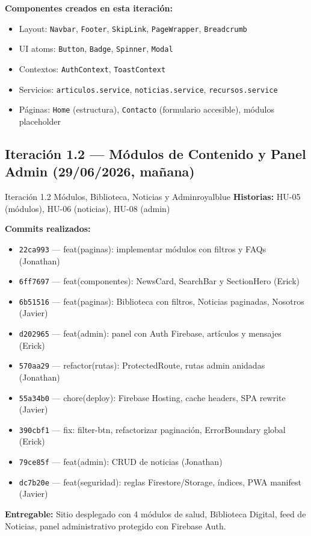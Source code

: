 \documentclass[12pt, a4paper]{article}
\begin{document}
\vspace{4pt}

\textbf{Componentes creados en esta iteración:}
\begin{itemize}
  \item Layout: \texttt{Navbar}, \texttt{Footer}, \texttt{SkipLink}, \texttt{PageWrapper}, \texttt{Breadcrumb}
  \item UI atoms: \texttt{Button}, \texttt{Badge}, \texttt{Spinner}, \texttt{Modal}
  \item Contextos: \texttt{AuthContext}, \texttt{ToastContext}
  \item Servicios: \texttt{articulos.service}, \texttt{noticias.service}, \texttt{recursos.service}
  \item Páginas: \texttt{Home} (estructura), \texttt{Contacto} (formulario accesible), módulos placeholder
\end{itemize}

\subsection{Iteración 1.2 --- Módulos de Contenido y Panel Admin (29/06/2026, mañana)}

\begin{iterbox}{Iteración 1.2 \quad Módulos, Biblioteca, Noticias y Admin}{royalblue}
\textbf{Historias:} HU-05 (módulos), HU-06 (noticias), HU-08 (admin)

\textbf{Commits realizados:}
\begin{itemize}
  \item \texttt{22ca993} --- feat(paginas): implementar módulos con filtros y FAQs (Jonathan)
  \item \texttt{6ff7697} --- feat(componentes): NewsCard, SearchBar y SectionHero (Erick)
  \item \texttt{6b51516} --- feat(paginas): Biblioteca con filtros, Noticias paginadas, Nosotros (Javier)
  \item \texttt{d202965} --- feat(admin): panel con Auth Firebase, artículos y mensajes (Erick)
  \item \texttt{570aa29} --- refactor(rutas): ProtectedRoute, rutas admin anidadas (Jonathan)
  \item \texttt{55a34b0} --- chore(deploy): Firebase Hosting, cache headers, SPA rewrite (Javier)
  \item \texttt{390cbf1} --- fix: filter-btn, refactorizar paginación, ErrorBoundary global (Erick)
  \item \texttt{79ce85f} --- feat(admin): CRUD de noticias (Jonathan)
  \item \texttt{dc7b20e} --- feat(seguridad): reglas Firestore/Storage, índices, PWA manifest (Javier)
\end{itemize}

\textbf{Entregable:} Sitio desplegado con 4 módulos de salud, Biblioteca Digital, feed de Noticias, panel administrativo protegido con Firebase Auth.
\end{iterbox}
\end{document}
